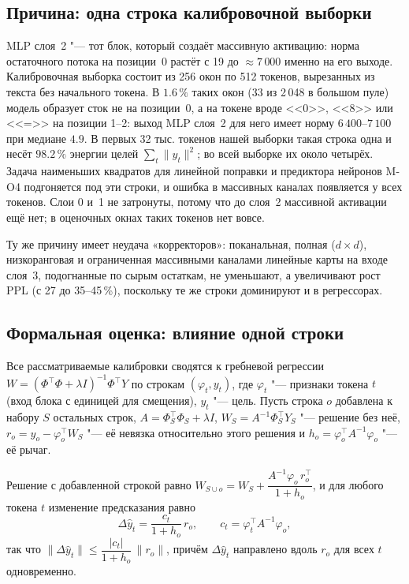 \subsection{Причина: одна строка калибровочной выборки}

MLP слоя~2 "--- тот блок, который создаёт массивную активацию: норма
остаточного потока на позиции~0 растёт с 19 до $\approx 7\,000$ именно
на его выходе. Калибровочная выборка состоит из 256 окон по 512
токенов, вырезанных из текста без начального токена. В $1.6\,\%$ таких
окон (33 из 2\,048 в большом пуле) модель образует сток не на позиции~0,
а на токене вроде <<0>>, <<8>> или <<=>> на позиции 1--2: выход MLP слоя~2
для него имеет норму $6\,400$--$7\,100$ при медиане $4.9$. В первых 32 тыс.
токенов нашей выборки такая строка одна и несёт $98.2\,\%$ энергии целей
$\sum_t\|y_t\|^2$; во всей выборке их около четырёх. Задача наименьших
квадратов для линейной поправки и предиктора нейронов M-O4 подгоняется
под эти строки, и ошибка в массивных каналах появляется у всех токенов.
Слои 0 и~1 не затронуты, потому что до слоя~2 массивной активации ещё
нет; в оценочных окнах таких токенов нет вовсе.

Ту же причину имеет неудача «корректоров»: поканальная, полная
($d\times d$), низкоранговая и ограниченная массивными каналами
линейные карты на входе слоя~3, подогнанные по сырым остаткам, не
уменьшают, а увеличивают рост PPL (с 27 до 35--45\,\%), поскольку те же
строки доминируют и в регрессорах.

\subsection{Формальная оценка: влияние одной строки}

Все рассматриваемые калибровки сводятся к гребневой регрессии
$W = (\Phi^\top\Phi + \lambda I)^{-1}\Phi^\top Y$ по строкам
$(\varphi_t, y_t)$, где $\varphi_t$ "--- признаки токена $t$ (вход блока с
единицей для смещения), $y_t$ "--- цель. Пусть строка $o$ добавлена к
набору $S$ остальных строк, $A = \Phi_S^\top\Phi_S + \lambda I$,
$W_S = A^{-1}\Phi_S^\top Y_S$ "--- решение без неё, $r_o = y_o -
\varphi_o^\top W_S$ "--- её невязка относительно этого решения и
$h_o = \varphi_o^\top A^{-1}\varphi_o$ "--- её рычаг.

\begin{proposition}\label{prop:leverage}
Решение с добавленной строкой равно
$W_{S\cup o} = W_S + \dfrac{A^{-1}\varphi_o\, r_o^\top}{1 + h_o}$, и для
любого токена $t$ изменение предсказания равно
\[
\Delta\hat y_t = \frac{c_{t}}{1 + h_o}\, r_o, \qquad c_t = \varphi_t^\top A^{-1}\varphi_o,
\]
так что $\|\Delta\hat y_t\| \le \dfrac{|c_t|}{1+h_o}\,\|r_o\|$, причём
$\Delta\hat y_t$ направлено вдоль $r_o$ для всех $t$ одновременно.
\end{proposition}

